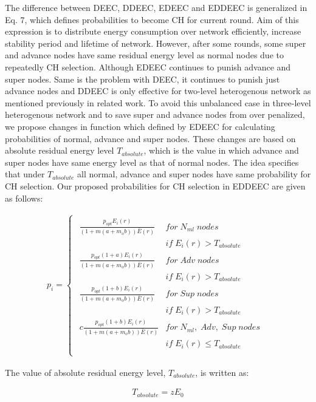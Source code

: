\documentclass[3p,times,procedia]{elsarticle}
\begin{document}
The difference between DEEC, DDEEC, EDEEC and EDDEEC is generalized in Eq. 7, which defines probabilities to become CH for current round. Aim of this expression is to distribute energy consumption over network efficiently, increase stability period and lifetime of network. However, after some rounds, some super and advance nodes have same residual energy level as normal nodes due to repeatedly CH selection. Although EDEEC continues to punish advance and super nodes. Same is the problem with DEEC, it continues to punish just advance nodes and DDEEC is only effective for two-level heterogenous network as mentioned previously in related work. To avoid this unbalanced case in three-level heterogenous network and to save super and advance nodes from over penalized, we propose changes in function which defined by EDEEC for calculating probabilities of normal, advance and super nodes. These changes are based on absolute residual energy level $T_{absolute}$, which is the value in which advance and super nodes have same energy level as that of normal nodes. The idea specifies that under $T_{absolute}$ all normal, advance and super nodes have same probability for CH selection. Our proposed probabilities for CH selection in EDDEEC are given as follows:

\begin{eqnarray}
p_{i}=
\begin{cases}
\begin{split}
\frac{p_{opt}E_{i}(r)}{(1+m(a+m_{o}b))\bar{E}(r)}   & for\; N_{ml} \;nodes\;\\& if\; E_{i}(r)>T_{absolute}\\
\frac{p_{opt}(1+a)E_{i}(r)}{(1+m(a+m_{o}b))\bar{E}(r)}  & for\; Adv \;nodes\;\\& if\; E_{i}(r)>T_{absolute}\\
\frac{p_{opt}(1+b)E_{i}(r)}{(1+m(a+m_{o}b))\bar{E}(r)}  & for\; Sup\; nodes\;\\& if\; E_{i}(r)>T_{absolute}\\
c\frac{p_{opt}(1+b)E_{i}(r)}{(1+m(a+m_{o}b))\bar{E}(r)} & for\; N_{ml},\; Adv,\; Sup\; nodes\;\\& if \;
 E_{i}(r)\leq T_{absolute}\\
\end{split}
\end{cases}
\end{eqnarray}
\normalsize

The value of absolute residual energy level, $T_{absolute}$, is written as:

\begin{eqnarray}
T_{absolute}= z E_{0}
\end{eqnarray}
\end{document}
